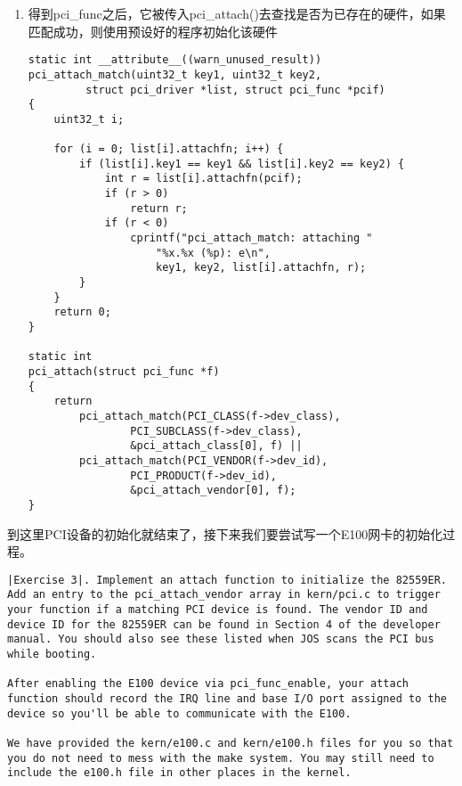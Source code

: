\documentclass{article}
\newcommand{\funcname}[1]{{\ttfamily \small #1}}
\begin{document}
\begin{CJK*}{UTF8}{gkai}
\begin{enumerate}
{}

\item{得到pci\_func之后，它被传入\funcname{pci\_attach()}去查找是否为已存在的硬件，如果匹配成功，则使用预设好的程序初始化该硬件

\begin{lstlisting}[style=ccode, firstnumber=67, title={\scriptsize \ttfamily \bfseries kern/pci.c}]
static int __attribute__((warn_unused_result))
pci_attach_match(uint32_t key1, uint32_t key2,
		 struct pci_driver *list, struct pci_func *pcif)
{
    uint32_t i;
	
    for (i = 0; list[i].attachfn; i++) {
        if (list[i].key1 == key1 && list[i].key2 == key2) {
            int r = list[i].attachfn(pcif);
            if (r > 0)
                return r;
            if (r < 0)
                cprintf("pci_attach_match: attaching "
                    "%x.%x (%p): e\n",
                    key1, key2, list[i].attachfn, r);
        }
    }
    return 0;
}

static int
pci_attach(struct pci_func *f)
{
    return
        pci_attach_match(PCI_CLASS(f->dev_class), 
                PCI_SUBCLASS(f->dev_class),
                &pci_attach_class[0], f) ||
        pci_attach_match(PCI_VENDOR(f->dev_id), 
                PCI_PRODUCT(f->dev_id),
                &pci_attach_vendor[0], f);
}
\end{lstlisting}


}
\end{enumerate}

到这里PCI设备的初始化就结束了，接下来我们要尝试写一个E100网卡的初始化过程。

\begin{lstlisting}[style=exercise]
|Exercise 3|. Implement an attach function to initialize the 82559ER. Add an entry to the pci_attach_vendor array in kern/pci.c to trigger your function if a matching PCI device is found. The vendor ID and device ID for the 82559ER can be found in Section 4 of the developer manual. You should also see these listed when JOS scans the PCI bus while booting.

After enabling the E100 device via pci_func_enable, your attach function should record the IRQ line and base I/O port assigned to the device so you'll be able to communicate with the E100.

We have provided the kern/e100.c and kern/e100.h files for you so that you do not need to mess with the make system. You may still need to include the e100.h file in other places in the kernel.


\end{lstlisting}
\end{CJK*}
\end{document}
